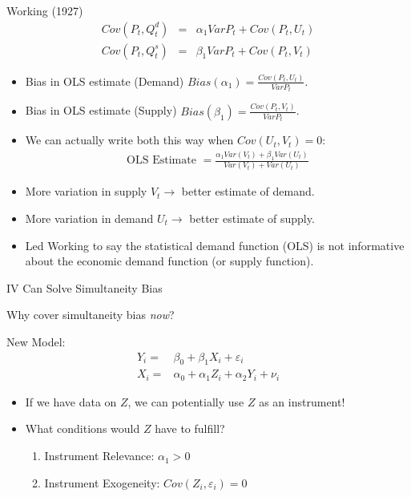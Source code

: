 \documentclass[aspectratio=169,11pt]{beamer}
\begin{document}
\begin{frame}{Working (1927)}
\small
\vspace{-0.2cm}
\begin{eqnarray*}
Cov(P_t, Q_t^d) &=& \alpha_1 Var P_t + Cov (P_t,U_t)\\
Cov(P_t, Q_t^s) &=& \beta_1 Var P_t + Cov (P_t,V_t)
\end{eqnarray*}
\vspace{-1cm}
\begin{itemize}
\item Bias in OLS estimate (Demand) $Bias(\alpha_1) = \frac{Cov(P_t,U_t)}{Var P_t}$.
\item Bias in OLS estimate (Supply) $Bias(\beta_1) = \frac{Cov(P_t,V_t)}{Var P_t}$.
\item We can actually write both this way when $Cov(U_t,V_t) = 0$:
\begin{eqnarray*}
\text{OLS Estimate }= \frac{\alpha_1 Var(V_t) + \beta_1 Var (U_t)}{Var (V_t) + Var (U_t)}
\end{eqnarray*}
\item More variation in supply $V_t \rightarrow$ better estimate of demand.
\item More variation in demand $U_t \rightarrow$ better estimate of supply.
\item Led Working to say the \alert{statistical demand function} (OLS) is not informative about the economic demand function (or supply function).
\end{itemize}
\end{frame}

\begin{frame}{IV Can Solve Simultaneity Bias}

Why cover simultaneity bias \emph{now}?

\vspace{3mm}

New Model:
\begin{align*}
	Y_i =& \beta_0 + \beta_1 X_i + \varepsilon_i\\
	X_i =& \alpha_0 + \alpha_1 Z_i + \alpha_2 Y_i + \nu_i
\end{align*}

\begin{itemize}
	\item If we have data on $Z$, we can potentially use $Z$ as an instrument!
	\item What conditions would $Z$ have to fulfill?
		\begin{enumerate}
			\item Instrument Relevance: $\alpha_1>0$
			\item Instrument Exogeneity: $Cov(Z_i,\varepsilon_i)=0$
		\end{enumerate}

\end{itemize}

\end{frame}
\end{document}
